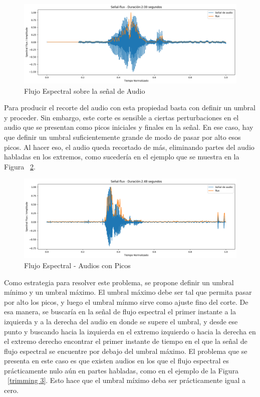 \documentclass[a4paper, 12pt]{article}
\begin{document}
\begin{figure}[h]
    \centering
    \includegraphics[width=0.8\linewidth]{trimming1.png}
    \caption{Flujo Espectral sobre la señal de Audio}
    \label{trimming 1}
\end{figure}

Para producir el recorte del audio con esta propiedad basta con definir un umbral y proceder. Sin embargo, este corte es sensible a ciertas perturbaciones en el audio que se presentan como picos iniciales y finales en la señal. En ese caso, hay que definir un umbral suficientemente grande de modo de pasar por alto esos picos. Al hacer eso, el audio queda recortado de más, eliminando partes del audio habladas en los extremos, como sucedería en el ejemplo que se muestra en la Figura ~\ref{trimming 2}.

\begin{figure}[h]
    \centering
    \includegraphics[width=0.8\linewidth]{trimming2.png}
    \caption{Flujo Espectral - Audios con Picos}
    \label{trimming 2}
\end{figure}

Como estrategia para resolver este problema, se propone definir un umbral mínimo y un umbral máximo. El umbral máximo debe ser tal que permita pasar por alto los picos, y luego el umbral mínmo sirve como ajuste fino del corte. De esa manera, se buscaría en la señal de flujo espectral el primer instante a la izquierda y a la derecha del audio en donde se supere el umbral, y desde ese punto y buscando hacia la izquierda en el extremo izquierdo o hacia la derecha en el extremo derecho encontrar el primer instante de tiempo en el que la señal de flujo espectral se encuentre por debajo del umbral máximo. El problema que se presenta en este caso es que existen audios en los que el flujo espectral es prácticamente nulo aún en partes habladas, como en el ejemplo de la Figura ~\ref{trimming 3}. Esto hace que el umbral míximo deba ser prácticamente igual a cero.
\end{document}
